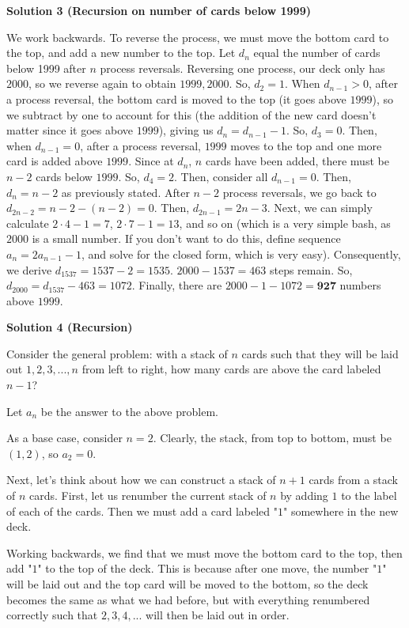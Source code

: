 \begin{enumerate}
 



\textbf{Solution 3 (Recursion on number of cards below 1999)}

We work backwards. To reverse the process, we must move the bottom card to the top, and add a new number to the top. Let $d_n$ equal the number of cards below 1999 after $n$ process reversals. Reversing one process, our deck only has $2000$, so we reverse again to obtain $1999, 2000$. So, $d_2 = 1$. When $d_{n-1} > 0$, after a process reversal, the bottom card is moved to the top (it goes above $1999$), so we subtract by one to account for this (the addition of the new card doesn't matter since it goes above $1999$), giving us $d_n = d_{n-1} - 1$. So, $d_3 = 0$. Then, when $d_{n-1} = 0$, after a process reversal, $1999$ moves to the top and one more card is added above $1999$. Since at $d_{n}$, $n$ cards have been added, there must be $n - 2$ cards below $1999$. So, $d_4 = 2$. Then, consider all $d_{n-1} = 0$. Then, $d_n = n-2$ as previously stated. After $n-2$ process reversals, we go back to $d_{2n - 2} = n - 2 - (n - 2) = 0$. Then, $d_{2n-1} = 2n - 3$. Next, we can simply calculate $2 \cdot 4 - 1 = 7$, $2 \cdot 7 - 1 = 13$, and so on (which is a very simple bash, as $2000$ is a small number. If you don't want to do this, define sequence $a_n = 2a_{n-1} - 1$, and solve for the closed form, which is very easy). Consequently, we derive $d_{1537} = 1537 - 2 = 1535$. $2000 - 1537 = 463$ steps remain. So, $d_{2000} = d_{1537} - 463 = 1072$. Finally, there are $2000 - 1 - 1072 = \boxed{\textbf{927}}$ numbers above $1999$.

 



\textbf{Solution 4 (Recursion)}

Consider the general problem: with a stack of $n$ cards such that they will be laid out $1, 2, 3, ..., n$ from left to right, how many cards are above the card labeled $n-1$?

 Let $a_n$ be the answer to the above problem.

 As a base case, consider $n=2$. Clearly, the stack, from top to bottom, must be $(1, 2)$, so $a_2=0$. 

 Next, let's think about how we can construct a stack of $n+1$ cards from a stack of $n$ cards. First, let us renumber the current stack of $n$ by adding $1$ to the label of each of the cards. Then we must add a card labeled "$1$" somewhere in the new deck.

 Working backwards, we find that we must move the bottom card to the top, then add "$1$" to the top of the deck. This is because after one move, the number "$1$" will be laid out and the top card will be moved to the bottom, so the deck becomes the same as what we had before, but with everything renumbered correctly such that $2, 3, 4, ...$ will then be laid out in order.


\end{enumerate}
